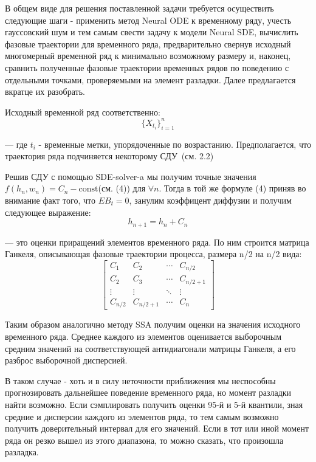 \documentclass{article}
\begin{document}
   \par В общем виде для решения поставленной задачи требуется осуществить следующие шаги - применить метод Neural ODE к временному ряду, учесть гауссовский шум и тем самым свести задачу к модели Neural SDE, вычислить фазовые траектории для временного ряда, предварительно свернув исходный многомерный временной ряд к минимально возможному размеру и, наконец, сравнить полученные фазовые траектории временных рядов по поведению с отдельными точками, проверяемыми на элемент разладки. Далее предлагается вкратце их разобрать.
   \par Исходный временной ряд соответственно: \begin{equation}\{X_{t_i}\}_{i=1}^n \end{equation} \par --- где $t_i$ - временные метки, упорядоченные по возрастанию. Предполагается, что траектория ряда подчиняется некоторому СДУ~(см. 2.2)
   \par Решив СДУ с помощью SDE-solver-a мы получим точные значения $f(h_n,w_n)= C_n-\text{const}$(см. (4)) для $\forall n$. Тогда в той же формуле (4) приняв во внимание факт того, что $E B_t=0$, занулим коэффицент диффузии и получим следующее выражение:
   \begin{equation} h_{n+1} = h_n + C_n    \end{equation}
   \par --- это оценки приращений элементов временного ряда. По ним строится матрица Ганкеля, описывающая фазовые траектории процесса, размера n/2 на n/2 вида:
    \begin{equation}
 \begin{bmatrix}
   C_1 & C_2 & \cdots & C_{n/2} \\
   C_2 & C_3 & \cdots & C_{n/2+1} \\
   \vdots  & \vdots  & \ddots & \vdots  \\
   C_{n/2} & C_{n/2+1} & \cdots & C_{n} 
 \end{bmatrix}
\end{equation}
   \par Таким образом аналогично методу SSA получим оценки на значения исходного временного ряда. Среднее каждого из элементов оценивается выборочным средним значений на соответствующей антидиагонали матрицы Ганкеля, а его разброс выборочной дисперсией.
   
   \par В таком случае - хоть и в силу неточности приближения мы неспособны прогнозировать дальнейшее поведение временного ряда, но момент разладки найти возможно. Если сэмплировать получить оценки 95-й и 5-й квантили, зная средние и дисперсии каждого из элементов ряда, то тем самым возможно получить доверительный интервал для его значений. Если в тот или иной момент ряда он резко вышел из этого диапазона, то можно сказать, что произошла разладка.
\end{document}
